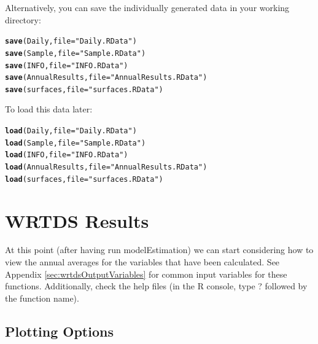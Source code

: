 \documentclass[a4paper,11pt]{article}\usepackage{graphicx, color}
\makeatletter
\newcommand{\hlfunctioncall}[1]{\textcolor[rgb]{0.501960784313725,0,0.329411764705882}{\textbf{#1}}}%
\newcommand{\hlstring}[1]{\textcolor[rgb]{0.6,0.6,1}{#1}}%
\newenvironment{kframe}{%
 \def\at@end@of@kframe{}%
 \ifinner\ifhmode%
  \def\at@end@of@kframe{\end{minipage}}%
  \begin{minipage}{\columnwidth}%
 \fi\fi%
 \def\FrameCommand##1{\hskip\@totalleftmargin \hskip-\fboxsep
 \colorbox{shadecolor}{##1}\hskip-\fboxsep
     \hskip-\linewidth \hskip-\@totalleftmargin \hskip\columnwidth}%
 \MakeFramed {\advance\hsize-\width
   \@totalleftmargin\z@ \linewidth\hsize
   \@setminipage}}%
 {\par\unskip\endMakeFramed%
 \at@end@of@kframe}
\newenvironment{knitrout}{}{} %
\makeatother
\begin{document}
Alternatively, you can save the individually generated data in your working directory:

\begin{knitrout}
\color{fgcolor}\begin{kframe}
\begin{alltt}
\hlfunctioncall{save}(Daily, file=\hlstring{"Daily.RData"})
\hlfunctioncall{save}(Sample, file=\hlstring{"Sample.RData"})
\hlfunctioncall{save}(INFO, file=\hlstring{"INFO.RData"})
\hlfunctioncall{save}(AnnualResults, file=\hlstring{"AnnualResults.RData"})
\hlfunctioncall{save}(surfaces, file=\hlstring{"surfaces.RData"})
\end{alltt}
\end{kframe}
\end{knitrout}


To load this data later:
\begin{knitrout}
\color{fgcolor}\begin{kframe}
\begin{alltt}
\hlfunctioncall{load}(Daily, file=\hlstring{"Daily.RData"})
\hlfunctioncall{load}(Sample, file=\hlstring{"Sample.RData"})
\hlfunctioncall{load}(INFO, file=\hlstring{"INFO.RData"})
\hlfunctioncall{load}(AnnualResults, file=\hlstring{"AnnualResults.RData"})
\hlfunctioncall{load}(surfaces, file=\hlstring{"surfaces.RData"})
\end{alltt}
\end{kframe}
\end{knitrout}



\FloatBarrier

\section{WRTDS Results}
\label{sec:wrtdsResults}
At this point (after having run modelEstimation) we can start considering how to view the annual averages for the variables that have been calculated.  See Appendix \ref{sec:wrtdsOutputVariables} for common input variables for these functions. Additionally, check the help files (in the R console, type ? followed by the function name).

\subsection{Plotting Options}
\label{sec:wrtdsPlotting}
\end{document}
